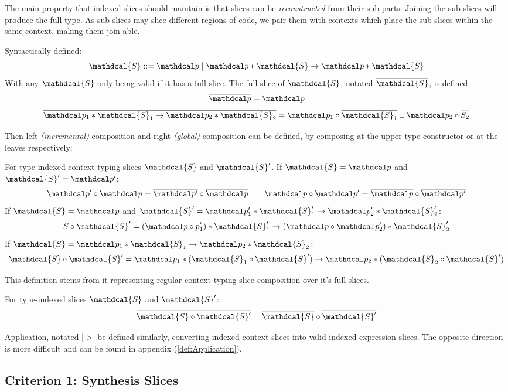 The main property that indexed-slices should maintain is that slices can be \textit{reconstructed} from their sub-parts. Joining the sub-slices will produce the full type. As sub-slices may slice different regions of code, we pair them with contexts which place the sub-slices within the same context, making them join-able.

\renewcommand{\S}{\mathdcal{S}}
\renewcommand{\s}{\mathdcal{s}}
\begin{definition}
Syntactically defined: 
\[\S ::= \p \mid \p * \S \to \p * \S\] 
With any $\S$ only being valid if it has a full slice. The full slice of $\S$, notated $\overline{\S}$, is defined:
\[\overline{\p} = \p\]
\[\overline{\p_1 * \S_1 \to \p_2 * \S_2} = \p_1 \circ \overline{\S_1} \sqcup \p_2 \circ \overline{S_2}\]
\end{definition}
Then left \textit{(incremental)} composition and right \textit{(global)} composition can be defined, by composing at the upper type constructor or at the leaves respectively:
\begin{definition}
For type-indexed context typing slices $\S$ and $\S'$.  If $\S = \p$ and $\S' = \p'$:
\[\p' \circ \p = \overline{\p'} \circ \overline{\p}\qquad \p \circ \p' = \overline{\p} \circ \overline{\p'}\]
If $\S = \p$ and $\S' = \p_1' * \S_1' \to \p_2' * \S_2'$:
\[S \circ \S' = (\p \circ p_1') * \S_1' \to (\p \circ \p_2') * \S_2'\]
If $\S = \p_1 * \S_1 \to \p_2 * \S_2$:
\[\S \circ \S' = \p_1 * (\S_1 \circ \S') \to \p_2 * (\S_2 \circ \S')\]
\end{definition}

This definition stems from it representing regular context typing slice composition over it's full slices.
\begin{proposition}
For type-indexed slices $\S$ and $\S'$: 
\[\overline{\S \circ \S'} = \overline{\S} \circ \overline{\S'}\]
\end{proposition}
Application, notated $\mid>$ be defined similarly, converting indexed context slices into valid indexed expression slices. The opposite direction is more difficult and can be found in appendix (\cref{def:Application}).


\subsection{Criterion 1: Synthesis Slices}
\label{sec:SynthesisSlices}

